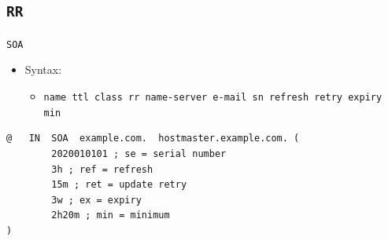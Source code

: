 \documentclass[xcolor=table]{beamer}
\begin{document}
\subsection{\texttt{RR}}
\begin{frame}[fragile]{\texttt{SOA}}
  \begin{itemize}
    \item Syntax:
      \begin{itemize}
        \item \texttt{name ttl class rr name-server e-mail sn refresh retry expiry min}
      \end{itemize}
  \end{itemize}
  \begin{tcolorbox}
    \lstset{
      basicstyle=\scriptsize\ttfamily,
    }
    \begin{lstlisting}
@   IN  SOA  example.com.  hostmaster.example.com. (
        2020010101 ; se = serial number
        3h ; ref = refresh
        15m ; ret = update retry
        3w ; ex = expiry
        2h20m ; min = minimum
)
    \end{lstlisting}
    \end{tcolorbox}
\end{frame}
\end{document}
